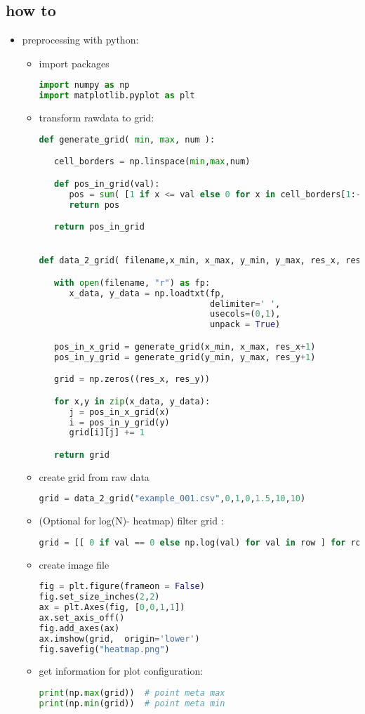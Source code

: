 \subsection{how to}
\begin{itemize}
	\item preprocessing with python:
	\begin{itemize}
		\item import packages
	\begin{lstlisting}[language=python]
import numpy as np
import matplotlib.pyplot as plt
\end{lstlisting}
	\item transform rawdata to grid:
	\begin{lstlisting}[language=python]
def generate_grid( min, max, num ):

   cell_borders = np.linspace(min,max,num)

   def pos_in_grid(val):
      pos = sum( [1 if x <= val else 0 for x in cell_borders[1:-1] ] )
      return pos

   return pos_in_grid


def data_2_grid( filename,x_min, x_max, y_min, y_max, res_x, res_y ):

   with open(filename, "r") as fp:
      x_data, y_data = np.loadtxt(fp, 
                                  delimiter=' ',
                                  usecols=(0,1), 
                                  unpack = True)

   pos_in_x_grid = generate_grid(x_min, x_max, res_x+1)
   pos_in_y_grid = generate_grid(y_min, y_max, res_y+1)

   grid = np.zeros((res_x, res_y))

   for x,y in zip(x_data, y_data):
      j = pos_in_x_grid(x)
      i = pos_in_y_grid(y)
      grid[i][j] += 1

   return grid
	\end{lstlisting}
	\item create grid from raw data
	\begin{lstlisting}[language=python]
grid = data_2_grid("example_001.csv",0,1,0,1.5,10,10)
	\end{lstlisting}
	\item (Optional for log(N)- heatmap) filter grid :
	\begin{lstlisting}[language=python]
grid = [[ 0 if val == 0 else np.log(val) for val in row ] for row in grid]
	\end{lstlisting}

\item create image file
\begin{lstlisting}[language=python]
fig = plt.figure(frameon = False)
fig.set_size_inches(2,2)
ax = plt.Axes(fig, [0,0,1,1])
ax.set_axis_off()
fig.add_axes(ax)
ax.imshow(grid,  origin='lower')
fig.savefig("heatmap.png")
	\end{lstlisting}
	\item get information for plot configuration:
\begin{lstlisting}[language=python]
print(np.max(grid))  # point meta max
print(np.min(grid))  # point meta min 
\end{lstlisting}
	\end{itemize}


\end{itemize}
